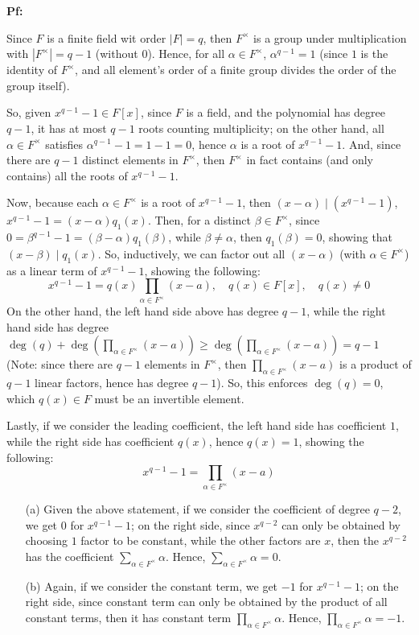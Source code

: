 \documentclass{article}
\begin{document}
\textbf{Pf:}

Since $F$ is a finite field wit order $|F|=q$, then $F^\times$ is a group under multiplication with $|F^\times|=q-1$ (without $0$).
Hence, for all $\alpha\in F^\times$, $\alpha^{q-1}=1$ (since $1$ is the identity of $F^\times$, and all element's order of a finite group divides the order of the group itself).

So, given $x^{q-1}-1\in F[x]$, since $F$ is a field, and the polynomial has degree $q-1$, it has at most $q-1$ roots counting multiplicity; on the other hand,
all $\alpha\in F^\times$ satisfies $\alpha^{q-1}-1=1-1=0$, hence $\alpha$ is a root of $x^{q-1}-1$. And, since there are $q-1$ distinct elements in $F^\times$,
then $F^\times$ in fact contains (and only contains) all the roots of $x^{q-1}-1$.

Now, because each $\alpha\in F^\times$ is a root of $x^{q-1}-1$, then $(x-\alpha)\mid (x^{q-1}-1)$, $x^{q-1}-1=(x-\alpha)q_1(x)$. Then, for a distinct $\beta\in F^\times$,
since $0=\beta^{q-1}-1=(\beta-\alpha)q_1(\beta)$, while $\beta\neq \alpha$, then $q_1(\beta)=0$, showing that $(x-\beta)\mid q_1(x)$.
So, inductively, we can factor out all $(x-\alpha)$ (with $\alpha\in F^\times$) as a linear term of $x^{q-1}-1$, showing the following:
$$x^{q-1}-1=q(x)\prod_{\alpha\in F^\times}(x-a),\quad q(x)\in F[x],\quad q(x)\neq 0$$
On the other hand, the left hand side above has degree $q-1$, while the right hand side has degree $\deg(q)+\deg(\prod_{\alpha\in F^\times}(x-a))\geq \deg(\prod_{\alpha\in F^\times}(x-a))=q-1$ 
(Note: since there are $q-1$ elements in $F^\times$, then $\prod_{\alpha\in F^\times}(x-a)$ is a product of $q-1$ linear factors, hence has degree $q-1$).
So, this enforces $\deg(q)=0$, which $q(x)\in F$ must be an invertible element.

Lastly, if we consider the leading coefficient, the left hand side has coefficient $1$, while the right side has coefficient $q(x)$, hence $q(x)=1$, showing the following:
$$x^{q-1}-1=\prod_{\alpha\in F^\times}(x-a)$$
\begin{itemize}
    \item[(a)] Given the above statement, if we consider the coefficient of degree $q-2$, we get $0$ for $x^{q-1}-1$; on the right side, since $x^{q-2}$ can only be obtained by choosing $1$ factor to be constant, 
    while the other factors are $x$, then the $x^{q-2}$ has the coefficient $\sum_{\alpha\in F^\times}\alpha$. Hence, $\sum_{\alpha\in F^\times}\alpha=0$.

    \item[(b)] Again, if we consider the constant term, we get $-1$ for $x^{q-1}-1$; on the right side, since constant term can only be obtained by the product of all constant terms, then it has constant term $\prod_{\alpha\in F^\times}\alpha$.
    Hence, $\prod_{\alpha\in F^\times}\alpha=-1$.
\end{itemize}
\end{document}
